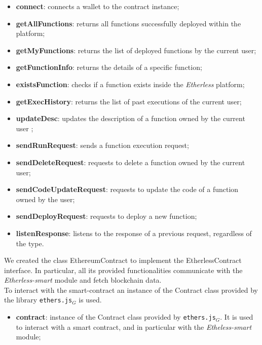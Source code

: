 					\begin{itemize}
						\item \textbf{connect}: connects a wallet to the contract instance;
						\item \textbf{getAllFunctions}: returns all functions successfully deployed within the platform;
						\item \textbf{getMyFunctions}: returns the list of deployed functions by the current user;
						\item \textbf{getFunctionInfo}: returns the details of a specific function;
						\item \textbf{existsFunction}: checks if a function exists inside the \textit{Etherless} platform;
						\item \textbf{getExecHistory}: returns the list of past executions of the current user;
						\item \textbf{updateDesc}: updates the description of a function owned by the current user ;
						\item \textbf{sendRunRequest}: sends a function execution request;
						\item \textbf{sendDeleteRequest}: requests to delete a function owned by the current user;
						\item \textbf{sendCodeUpdateRequest}: requests to update the code of a function owned by the user;
						\item \textbf{sendDeployRequest}: requests to deploy a new function;
						\item \textbf{listenResponse}: listens to the response of a previous request, regardless of the type.
					\end{itemize}

			We created the class EthereumContract to implement the EtherlessContract interface. In particular, all its provided functionalities communicate with the \textit{Etherless-smart} module and fetch blockchain data. \\ To interact with the smart-contract an instance of the Contract class provided by the library \texttt{ethers.js}$_{G}$ is used.
					\begin{itemize}
						\item \textbf{contract}: instance of the Contract class provided by \texttt{ethers.js}$_{G}$. It is used to interact with a smart contract, and in particular with the \textit{Etheless-smart} module;
					\end{itemize}

